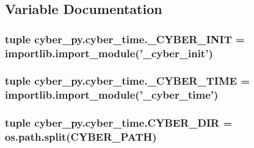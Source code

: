 \subsection{Variable Documentation}
\hypertarget{namespacecyber__py_1_1cyber__time_a7ea33ec20ee4662014698fd3345ae83b}{
\subsubsection[{\-\_\-\-C\-Y\-B\-E\-R\-\_\-\-I\-N\-I\-T}]{\setlength{\rightskip}{0pt plus 5cm}tuple cyber\-\_\-py.\-cyber\-\_\-time.\-\_\-\-C\-Y\-B\-E\-R\-\_\-\-I\-N\-I\-T = importlib.\-import\-\_\-module('\-\_\-cyber\-\_\-init')}}\label{namespacecyber__py_1_1cyber__time_a7ea33ec20ee4662014698fd3345ae83b}
\hypertarget{namespacecyber__py_1_1cyber__time_ad395f8a1e071492a14b1ab84f1eaac58}{
\subsubsection[{\-\_\-\-C\-Y\-B\-E\-R\-\_\-\-T\-I\-M\-E}]{\setlength{\rightskip}{0pt plus 5cm}tuple cyber\-\_\-py.\-cyber\-\_\-time.\-\_\-\-C\-Y\-B\-E\-R\-\_\-\-T\-I\-M\-E = importlib.\-import\-\_\-module('\-\_\-cyber\-\_\-time')}}\label{namespacecyber__py_1_1cyber__time_ad395f8a1e071492a14b1ab84f1eaac58}
\hypertarget{namespacecyber__py_1_1cyber__time_abd73c61394f5397dc5a834393b9ee2ba}{
\subsubsection[{C\-Y\-B\-E\-R\-\_\-\-D\-I\-R}]{\setlength{\rightskip}{0pt plus 5cm}tuple cyber\-\_\-py.\-cyber\-\_\-time.\-C\-Y\-B\-E\-R\-\_\-\-D\-I\-R = os.\-path.\-split({\bf C\-Y\-B\-E\-R\-\_\-\-P\-A\-T\-H})}}\label{namespacecyber__py_1_1cyber__time_abd73c61394f5397dc5a834393b9ee2ba}
